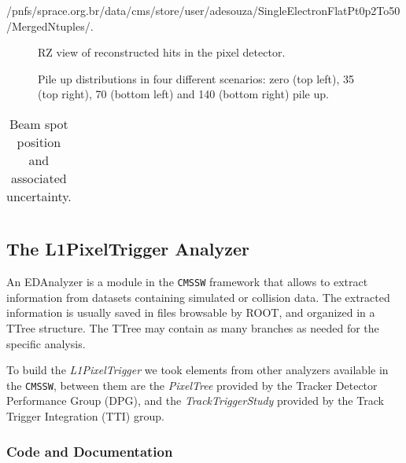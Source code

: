 \documentclass[a4paper,12pt,oneside]{article}
\begin{document}
                   {\footnotesize /pnfs/sprace.org.br/data/cms/store/user/adesouza/SingleElectronFlatPt0p2To50/MergedNtuples/}.

                   
                   \begin{figure}[!htb]
                     \centering
                     \caption{RZ view of reconstructed hits in the pixel detector.}
                     \label{}
                   \end{figure}
                   
                   \begin{figure}[!htb]
                     \centering
                     \caption{Pile up distributions in four different scenarios: zero (top left), 35 (top right), 70 (bottom
                       left) and 140 (bottom right) pile up.}
                     \label{}
                   \end{figure}
                   
                   \begin{table}[!htb]
                     \centering
                     \caption{Beam spot position and associated uncertainty.}
                     \label{}
                     \begin{tabular}{ccc}
                     \end{tabular}
                   \end{table}

        \subsection{The L1PixelTrigger Analyzer}
        An EDAnalyzer is a module in the \texttt{CMSSW} framework that allows to extract information from datasets containing simulated or collision data. The extracted information is usually saved in files browsable by ROOT, and organized in a TTree structure. The TTree may contain as many branches as needed for the specific analysis.

To build the \textit{L1PixelTrigger} we took elements from other analyzers available in the \texttt{CMSSW}, between them are the \textit{PixelTree} provided by the Tracker Detector Performance Group (DPG), and the \textit{TrackTriggerStudy} provided by the Track Trigger Integration (TTI) group. 

                   \subsubsection{Code and Documentation}
\end{document}
